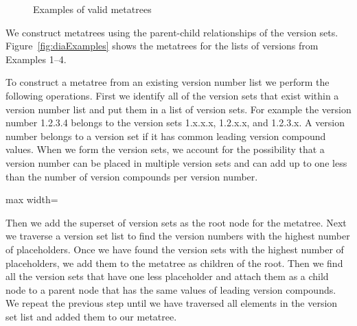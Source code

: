 \documentclass[conference]{IEEEtran}
\begin{document}
\begin{figure}
\begin{center}

\end{center}
\caption{Examples of valid metatrees}
\label{fig:validMetatrees}
\end{figure}





We construct metatrees using the parent-child relationships of the version sets.
Figure~\ref{fig:diaExamples} shows the metatrees for the lists of versions from Examples 1--4. 

To construct a metatree from an existing version number list we perform the following operations.
First we identify all of the version sets that exist within a version number list and put them in a list of version sets.
For example the version number 1.2.3.4 belongs to the version sets 1.x.x.x, 1.2.x.x, and 1.2.3.x. 
A version number belongs to a version set if it has common leading version compound values.
When we form the version sets, we account for the possibility that a version number can be placed in multiple version sets and can add up to one less than the number of version compounds per version number.

\begin{figure*}
 \begin{adjustbox}{max width=\textwidth}

\end{adjustbox}
\caption{Examples of metatrees. The bolded version numbers are the existing version numbers for the example projects and the italicized version numbers are the \choices.}
\label{fig:diaExamples}
\end{figure*}


Then we add the superset of version sets as the root node for the metatree.
Next we traverse a version set list to find the version numbers with the highest number of placeholders.
Once we have found the version sets with the highest number of placeholders, we add them to the metatree as children of the root.
Then we find all the version sets that have one less placeholder and attach them as a child node to a parent node that has the same values of leading version compounds.
We repeat the previous step until we have traversed all elements in the version set list and added them to our metatree.
\end{document}
